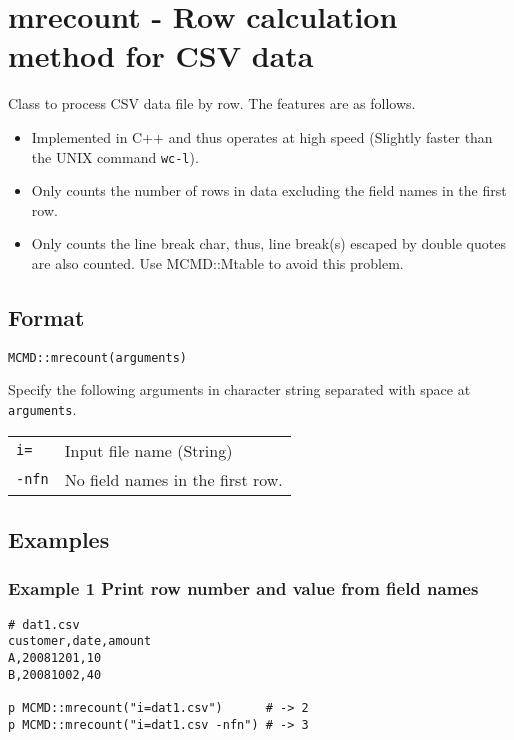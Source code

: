 
%

\section{mrecount - Row calculation method for CSV data \label{sect:mrecountRB}}
Class to process CSV data file by row. The features are as follows.
\begin{itemize}
\item Implemented in C++ and thus operates at high speed (Slightly faster than the UNIX command  \verb|wc-l|).
\item Only counts the number of rows in data excluding the field names in the first row.
\item Only counts the line break char, thus, line break(s) escaped by double quotes are also counted. 
Use MCMD::Mtable to avoid this problem.

\end{itemize}

\subsection{Format}
 
{\large
\begin{verbatim}
MCMD::mrecount(arguments)
\end{verbatim}
}

Specify the following arguments in character string separated with space at \verb|arguments|.


\begin{table}[htbp]
\begin{tabular}{ll}
\verb|i=|    & Input file name (String)\\
\verb|-nfn|  & No field names in the first row. \\
\end{tabular} 
\end{table} 

\subsection{Examples}
\subsubsection*{Example 1 Print row number and value from field names}

\begin{Verbatim}[baselinestretch=0.7,frame=single]
# dat1.csv
customer,date,amount
A,20081201,10
B,20081002,40

p MCMD::mrecount("i=dat1.csv")      # -> 2
p MCMD::mrecount("i=dat1.csv -nfn") # -> 3
\end{Verbatim}

